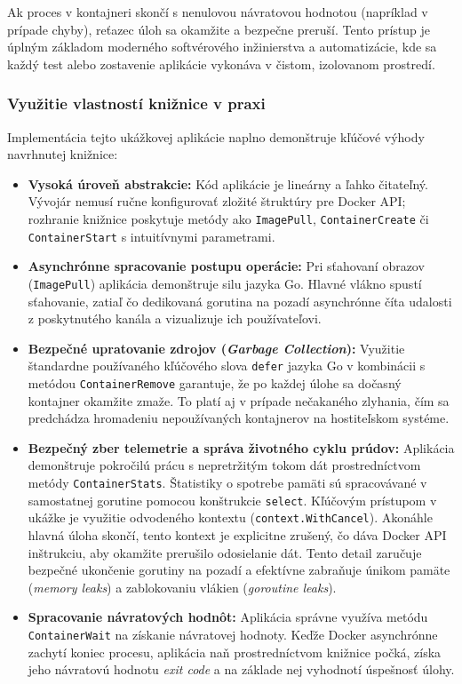 \documentclass[
 program=infpvs,
  language=slovak,
  figures=false,
  tables=false,
  sourcecodes,
  glossaries,
  index
]{kidiplom}
\begin{document}
{Ak proces v kontajneri skončí s nenulovou návratovou hodnotou (napríklad v prípade chyby), reťazec úloh sa okamžite a bezpečne preruší. Tento prístup je úplným základom moderného softvérového inžinierstva a automatizácie, kde sa každý test alebo zostavenie aplikácie vykonáva v čistom, izolovanom prostredí.



\subsubsection{Využitie vlastností knižnice v praxi}  \label{sec:vlastnosti-ukazky}
Implementácia tejto ukážkovej aplikácie naplno demonštruje kľúčové výhody navrhnutej knižnice:

\begin{itemize}
    \item \textbf{Vysoká úroveň abstrakcie:} Kód aplikácie je lineárny a ľahko čitateľný. Vývojár nemusí ručne konfigurovať zložité štruktúry pre Docker API; rozhranie knižnice poskytuje metódy ako \texttt{ImagePull}, \texttt{ContainerCreate} či \texttt{ContainerStart} s intuitívnymi parametrami.
    \item \textbf{Asynchrónne spracovanie postupu operácie:} Pri sťahovaní obrazov (\texttt{ImagePull}) aplikácia demonštruje silu jazyka Go. Hlavné vlákno spustí sťahovanie, zatiaľ čo dedikovaná gorutina na pozadí asynchrónne číta udalosti z poskytnutého kanála a vizualizuje ich používateľovi.
    \item \textbf{Bezpečné upratovanie zdrojov (\textit{Garbage Collection}):} Využitie štandardne používaného kľúčového slova \texttt{defer} jazyka Go v kombinácii s metódou \texttt{ContainerRemove} garantuje, že po každej úlohe sa dočasný kontajner okamžite zmaže. To platí aj v prípade nečakaného zlyhania, čím sa predchádza hromadeniu nepoužívaných kontajnerov na hostiteľskom systéme.
        \item \textbf{Bezpečný zber telemetrie a správa životného cyklu prúdov:} Aplikácia demonštruje pokročilú prácu s nepretržitým tokom dát prostredníctvom metódy \texttt{ContainerStats}. Štatistiky o spotrebe pamäti sú spracovávané v samostatnej gorutine pomocou konštrukcie \texttt{select}. Kľúčovým prístupom v ukážke je využitie odvodeného kontextu (\texttt{context.WithCancel}). Akonáhle hlavná úloha skončí, tento kontext je explicitne zrušený, čo dáva Docker API inštrukciu, aby okamžite prerušilo odosielanie dát. Tento detail zaručuje bezpečné ukončenie gorutiny na pozadí a efektívne zabraňuje únikom pamäte (\textit{memory leaks}) a zablokovaniu vlákien (\textit{goroutine leaks}).
    \item \textbf{Spracovanie návratových hodnôt:} Aplikácia správne využíva metódu \texttt{ContainerWait} na získanie návratovej hodnoty. Keďže Docker asynchrónne zachytí koniec procesu, aplikácia naň prostredníctvom knižnice počká, získa jeho návratovú hodnotu \textit{exit code} a na základe nej vyhodnotí úspešnosť úlohy.
\end{itemize}

}
\end{document}
